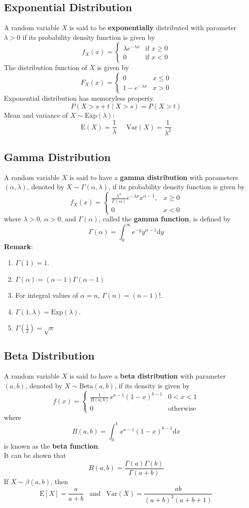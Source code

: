 \documentclass[12pt]{article}
\newcommand{\diff}{\mathrm{d}}
\newcommand{\var}{\mathrm{Var}}
\newcommand{\expec}{\mathrm{E}}
\newcommand{\expo}{\mathrm{Exp}}
\newcommand{\betadis}{\mathrm{Beta}}
\theoremstyle{definition}
\begin{document}
\subsection{Exponential Distribution}
A random variable $X$ is said to be \textbf{exponentially} distributed with parameter $\lambda>0$ if its probability density function is given by
\[
f_X(x) = \begin{cases}
\lambda e^{-\lambda x}&\text{if }x\geq 0\\
0&\text{if }x<0
\end{cases}
\]
The distribution function of $X$ is given by
\[
F_X(x)=\begin{cases}
0&x\leq 0\\
1-e^{-\lambda x}&x>0
\end{cases}
\]
Exponential distribution has memoryless property.
\[
P(X>s+t\mid X>s)=P(X>t)
\]
Mean and variance of $X\sim\expo(\lambda)$:
\[
\expec(X)=\frac{1}{\lambda}\;\;\;\;\;\var(X)=\frac{1}{\lambda^2}
\]
\subsection{Gamma Distribution}
A random variable $X$ is said to have a \textbf{gamma distribution} with parameters $(\alpha, \lambda)$, denoted by $X\sim\Gamma(\alpha, \lambda)$, if its probability density function is given by
\[
f_X(x)=\begin{cases}
\frac{\lambda^\alpha}{\Gamma(\alpha)}e^{-\lambda x}x^{\alpha-1},&x\geq 0\\
0&x<0
\end{cases}
\]
where $\lambda>0$, $\alpha>0$, and $\Gamma(\alpha)$, called the \textbf{gamma function}, is defined by
\[
\Gamma(\alpha) = \int_0^\infty e^{-y}y^{\alpha-1}\diff y
\]
\textbf{Remark}:
\begin{enumerate}
\item $\Gamma(1)=1$.
\item $\Gamma(\alpha) =(\alpha-1)\Gamma(\alpha-1)$
\item For integral values of $\alpha = n$, $\Gamma(n)=(n-1)!$.
\item $\Gamma(1,\lambda)=\expo(\lambda)$.
\item $\Gamma(\frac{1}{2})=\sqrt{\pi}$
\end{enumerate}
\subsection{Beta Distribution}
A random variable $X$ is said to have a \textbf{beta distribution} with parameter $(a,b)$, denoted by $X\sim \betadis(a,b)$, if its density is given by
\[
f(x)=\begin{cases}
\frac{1}{B(a,b)}x^{a-1}(1-x)^{b-1}&0<x<1\\
0&\text{otherwise}
\end{cases}
\]
where
\[
B(a,b)=\int_0^1x^{a-1}(1-x)^{b-1}\diff x
\]
is known as the \textbf{beta function}.\\
It can be shown that
\[
B(a,b)=\frac{\Gamma(a)\Gamma(b)}{\Gamma(a+b)}
\]
If $X\sim\beta(a,b)$, then
\[
\expec[X]=\frac{a}{a+b}\;\;\;\text{and}\;\;\;\var(X)=\frac{ab}{(a+b)^2(a+b+1)}
\]
\end{document}
